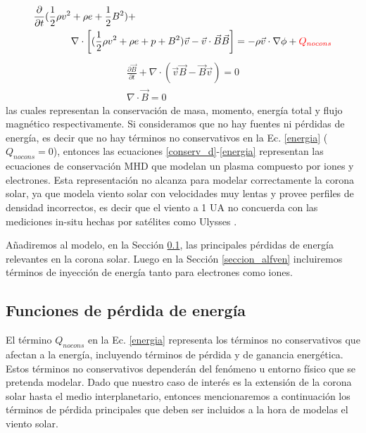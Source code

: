 \documentclass[a4paper,11pt]{report}
\begin{document}
\begin{equation}
\begin{split} 
 \frac{\partial}{\partial t} (\frac{1}{2}\rho v^2 &+ \rho e +\frac{1}{2} B^2) +\\ 
& \nabla \cdot \left[ (\frac{1}{2}\rho v^2 + \rho e + p + B^2) \vec{v} -\vec{v}\cdot \vec{B}\vec{B}  \right] = -\rho \vec{v} \cdot \nabla \phi +\textcolor{red}{Q_{nocons}} \label{energia}
\end{split}
\end{equation}
\begin{eqnarray}
\frac{\partial \vec{B}}{\partial t} + \nabla \cdot (\vec{v}\vec{B} -\vec{B}\vec{v} ) = 0\\ \label{conserv_bflux}
\nabla \cdot \vec{B} = 0 
\end{eqnarray}
las cuales representan la conservación de masa, momento, energía total y flujo magnético respectivamente. Si consideramos que no hay fuentes ni pérdidas de energía, es decir que no hay términos no conservativos en la Ec. \ref{energia} ($Q_{nocons} = 0$), entonces las ecuaciones \ref{conserv_d}-\ref{energia} representan las ecuaciones de conservación MHD que modelan un plasma compuesto por iones y electrones. Esta representación no alcanza para modelar correctamente la corona solar, ya que modela viento solar con velocidades muy lentas y provee perfiles de densidad incorrectos, es decir que el viento a 1 UA no concuerda con las mediciones in-situ hechas por satélites como Ulysses \citep{mccomas_2000}.

Añadiremos al modelo, en la Sección \ref{seccion_perdida}, las principales pérdidas de energía relevantes en la corona solar. Luego en la Sección \ref{seccion_alfven} incluiremos términos de inyección de energía tanto para electrones como iones.





\subsection{Funciones de pérdida de energía} \label{seccion_perdida}
El término $Q_{nocons}$ en la Ec. \ref{energia} representa los términos no conservativos que afectan a la energía, incluyendo términos de pérdida y de ganancia energética. Estos términos no conservativos dependerán del fenómeno u entorno físico que se pretenda modelar. Dado que nuestro caso de interés es la extensión de la corona solar hasta el medio interplanetario, entonces mencionaremos a continuación los términos de pérdida principales que deben ser incluidos a la hora de modelas el viento solar. 
\end{document}
